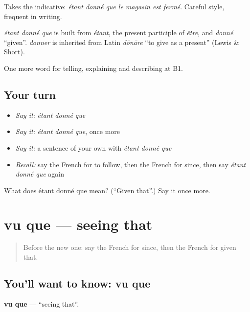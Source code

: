 Takes the indicative: \emph{étant donné que le magasin est fermé}. Careful style, frequent in writing.

\begin{cousinweb}
\emph{étant donné que} is built from \emph{étant}, the present participle of \emph{être}, and \emph{donné} \textquotedblleft{}given\textquotedblright{}. \emph{donner} is inherited from Latin \emph{dōnāre} \textquotedblleft{}to give as a present\textquotedblright{} (Lewis \& Short).
\end{cousinweb}

\begin{grammarlens}[title={What you've built}]
One more word for telling, explaining and describing at B1.
\end{grammarlens}

\subsection*{Your turn}
\begin{itemize}
\raggedright
  \item \emph{Say it:} \emph{étant donné que}
  \item \emph{Say it:} \emph{étant donné que}, once more
  \item \emph{Say it:} a sentence of your own with \emph{étant donné que}
  \item \emph{Recall:} say the French for to follow, then the French for since, then say \emph{étant donné que} again
\end{itemize}

\begin{tcolorbox}[breakable,colback=teal!4,colframe=teal!35!black,title={Before you move on}]
What does étant donné que mean? (\textquotedblleft{}Given that\textquotedblright{}.) Say it once more.
\end{tcolorbox}
\section[vu que]{vu que — seeing that}

\label{lesson:FR-C347-vu-que}



\begin{quote}
Before the new one: say the French for since, then the French for given that.
\end{quote}

\subsection*{You'll want to know: vu que}
\textbf{vu que} — \textquotedblleft{}seeing that\textquotedblright{}.

